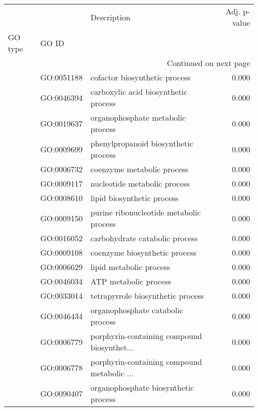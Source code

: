 \begin{longtable}{lllr}
\toprule
   &            &                                  Description &  Adj. p-value \\
GO type & GO ID &                                              &               \\
\midrule
\endhead
\midrule
\multicolumn{4}{r}{{Continued on next page}} \\
\midrule
\endfoot

\bottomrule
\endlastfoot
\multirow{167}{*}{BP} & GO:0051188 &                cofactor biosynthetic process &         0.000 \\
   & GO:0046394 &         carboxylic acid biosynthetic process &         0.000 \\
   & GO:0019637 &            organophosphate metabolic process &         0.000 \\
   & GO:0009699 &         phenylpropanoid biosynthetic process &         0.000 \\
   & GO:0006732 &                   coenzyme metabolic process &         0.000 \\
   & GO:0009117 &                 nucleotide metabolic process &         0.000 \\
   & GO:0008610 &                   lipid biosynthetic process &         0.000 \\
   & GO:0009150 &      purine ribonucleotide metabolic process &         0.000 \\
   & GO:0016052 &               carbohydrate catabolic process &         0.000 \\
   & GO:0009108 &                coenzyme biosynthetic process &         0.000 \\
   & GO:0006629 &                      lipid metabolic process &         0.000 \\
   & GO:0046034 &                        ATP metabolic process &         0.000 \\
   & GO:0033014 &            tetrapyrrole biosynthetic process &         0.000 \\
   & GO:0046434 &            organophosphate catabolic process &         0.000 \\
   & GO:0006779 &  porphyrin-containing compound biosynthet... &         0.000 \\
   & GO:0006778 &  porphyrin-containing compound metabolic ... &         0.000 \\
   & GO:0090407 &         organophosphate biosynthetic process &         0.000 \\

\end{longtable}
